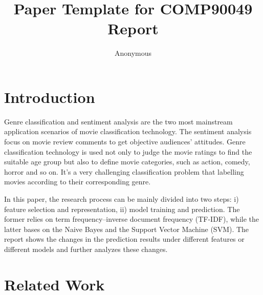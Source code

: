 \documentclass[11pt]{article}
\title{Paper Template for COMP90049 Report}
\author
{Anonymous}
\begin{document}
\maketitle

\section{Introduction}

Genre classification and sentiment analysis are the two most mainstream application scenarios of movie classification technology. The sentiment analysis focus on movie review comments to get objective audiences' attitudes. Genre classification technology is used not only to judge the movie ratings to find the suitable age group but also to define movie categories, such as action, comedy, horror and so on. It's a very challenging classification problem that labelling movies according to their corresponding genre.

In this paper, the research process can be mainly divided into two steps: i) feature selection and representation, ii) model training and prediction. The former relies on term frequency–inverse document frequency (TF-IDF), while the latter bases on the Naive Bayes and the Support Vector Machine (SVM). The report shows the changes in the prediction results under different features or different models and further analyzes these changes.





\section{Related Work}
\end{document}
